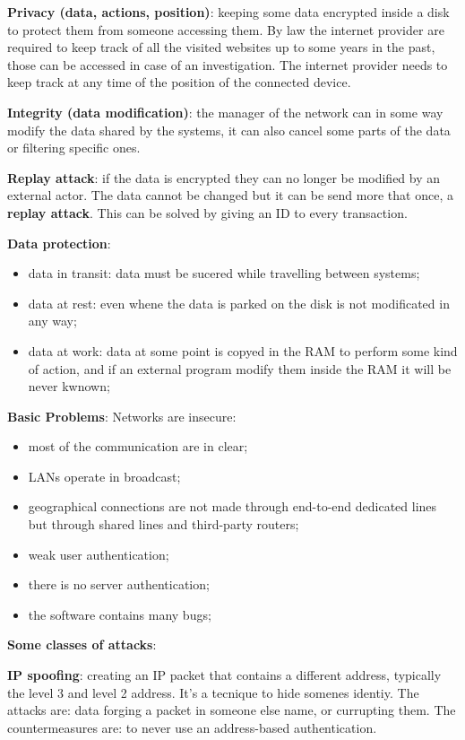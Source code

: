 \documentclass[12pt]{article}
\begin{document}
\textbf{Privacy (data, actions, position)}: keeping some data encrypted inside a disk to protect them from someone accessing them. By law the internet provider are required to keep track of all the visited websites up to some years in the past, those can be accessed in case of an investigation. The internet provider needs to keep track at any time of the position of the connected device.

\textbf{Integrity (data modification)}: the manager of the network can in some way modify the data shared by the systems, it can also cancel some parts of the data or filtering specific ones.

\textbf{Replay attack}: if the data is encrypted they can no longer be modified by an external actor. The data cannot be changed but it can be send more that once, a \textbf{replay attack}. This can be solved by giving an ID to every transaction.

\textbf{Data protection}:
\begin{itemize}
    \item data in transit: data must be sucered while travelling between systems;
    \item data at rest: even whene the data is parked on the disk is not modificated in any way;
    \item data at work: data at some point is copyed in the RAM to perform some kind of action, and if an external program modify them inside the RAM it will be never kwnown;
\end{itemize}


\textbf{Basic Problems}: Networks are insecure:
\begin{itemize}
    \item most of the communication are in clear;
    \item LANs operate in broadcast;
    \item geographical connections are not made through end-to-end dedicated lines but through shared lines and third-party routers;
    \item weak user authentication;
    \item there is no server authentication;
    \item the software contains many bugs;
\end{itemize}

\textbf{Some classes of attacks}:

\textbf{IP spoofing}: creating an IP packet that contains a different address, typically the level 3 and level 2 address. It's a tecnique to hide somenes identiy. The attacks are: data forging a packet in someone else name, or currupting them. The countermeasures are: to never use an address-based authentication.
\end{document}

